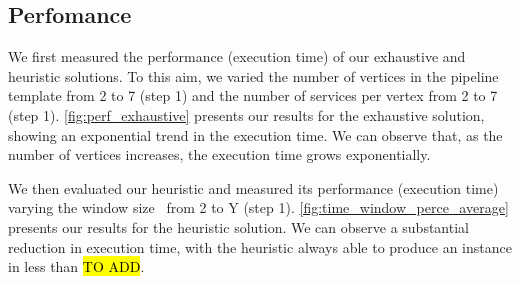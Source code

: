   \subsection{Perfomance}\label{subsec:experiments_performance}
  We first measured the performance (execution time) of our exhaustive and heuristic solutions. To this aim, we varied the number of vertices in the pipeline template from 2 to 7 (step 1) and the number of services per vertex from 2 to 7 (step 1). \cref{fig:perf_exhaustive} presents our results for the exhaustive solution, showing an exponential trend in the execution time. We can observe that, as the number of vertices increases, the execution time grows exponentially.

  We then evaluated our heuristic and measured its performance (execution time) varying the window size \windowsize\ from 2 to Y (step 1). \cref{fig:time_window_perce_average} presents our results for the heuristic solution. We can observe a substantial reduction in execution time, with the heuristic always able to produce an instance in less than \hl{TO ADD}.

